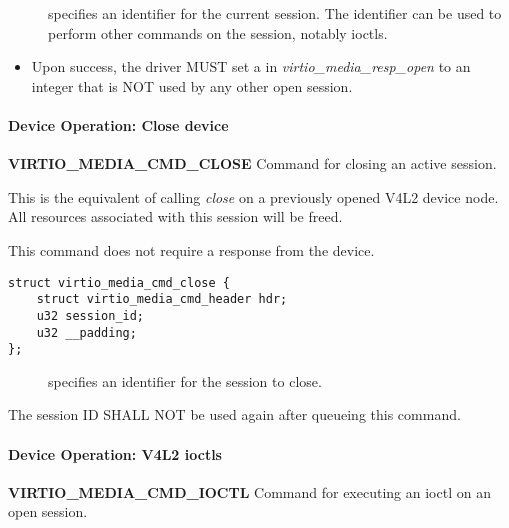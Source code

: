 \begin{description}
\item[] specifies an identifier for the current session. The
identifier can be used to perform other commands on the session, notably ioctls.
\end{description}


\begin{itemize}
\item Upon success, the driver MUST set a  in \textit{virtio_media_resp_open}
to an integer that is NOT used by any other open session.
\end{itemize}

\paragraph{Device Operation: Close device}

\textbf{VIRTIO_MEDIA_CMD_CLOSE} Command for closing an active session.

This is the equivalent of calling \textit{close} on a previously opened V4L2
device node. All resources associated with this session will be freed.

This command does not require a response from the device.

\begin{lstlisting}
struct virtio_media_cmd_close {
    struct virtio_media_cmd_header hdr;
    u32 session_id;
    u32 __padding;
};
\end{lstlisting}

\begin{description}
\item[] specifies an identifier for the session to close.
\end{description}


The session ID SHALL NOT be used again after queueing this command.

\paragraph{Device Operation: V4L2 ioctls}

\textbf{VIRTIO_MEDIA_CMD_IOCTL} Command for executing an ioctl on an open
session.

